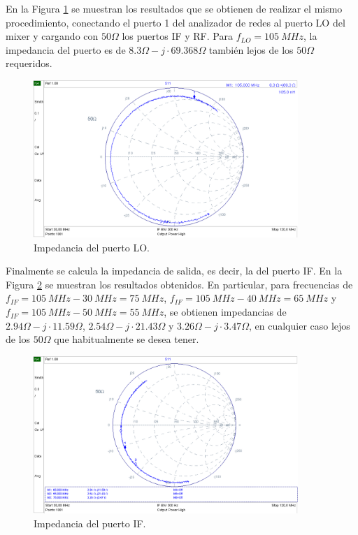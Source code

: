 \documentclass[a4paper,10pt]{article}
\begin{document}
	\indent En la Figura \ref{impedancia2} se muestran los resultados que se obtienen de
	realizar el mismo procedimiento, conectando el puerto 1 del analizador de 
	redes al puerto LO del mixer y cargando con $50\Omega$ los puertos IF y RF. 
	Para $f_{LO}=105~MHz$, la impedancia del puerto es de 
	$8.3\Omega-j\cdot69.368\Omega$ tambi\'en lejos de los $50\Omega$ requeridos.
	
	\begin{figure}[!htb]
		\centering
		\includegraphics[width=10cm]{Images/impedanciaLO.png}
		\caption{Impedancia del puerto LO.}
		\label{impedancia2}		
	\end{figure}
	
	\indent Finalmente se calcula la impedancia de salida, es decir, la del 
	puerto IF. En la Figura \ref{impedancia3} se muestran los resultados 
	obtenidos. En particular, para  frecuencias de 
	$f_{IF}=105~MHz-30~MHz=75~MHz$, $f_{IF}=105~MHz-40~MHz=65~MHz$ y 
	$f_{IF}=105~MHz-50~MHz=55~MHz$, se obtienen impedancias de 
	$2.94\Omega-j\cdot11.59\Omega$, $2.54\Omega-j\cdot21.43\Omega$ y 
	$3.26\Omega-j\cdot3.47\Omega$, en cualquier caso lejos de los $50\Omega$ que
	habitualmente se desea tener.
	
	\begin{figure}[!htb]
		\centering
		\includegraphics[width=10cm]{Images/impedanciaIF.png}
		\caption{Impedancia del puerto IF.}
		\label{impedancia3}
	\end{figure}			
	
\end{document}
